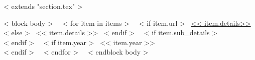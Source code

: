 ~< extends "section.tex" >~

~< block body >~
  ~< for item in items >~
    ~< if item.url >~
      \href{<< item.url >>}{<< item.details>>}
    ~< else >~
      << item.details >>
    ~< endif >~
    ~< if item.sub_details >~
      \,\, {\scriptsize
        \color{gray}{<< item.sub_details >>}
      } \\[2mm]
    ~< endif >~
    ~< if item.year >~
        \hfill << item.year >> \\
    ~< endif >~
  ~< endfor >~
~< endblock body >~